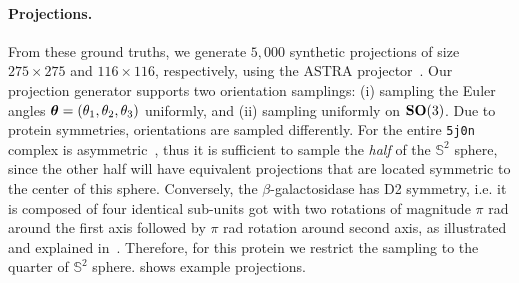 \paragraph{Projections.}
From these ground truths, we generate $5,000$ synthetic projections of size $275\times 275$ and $116\times 116$, respectively, using the ASTRA projector~\cite{van2015astra}.
Our projection generator supports two orientation samplings: (i) sampling the Euler angles ${\boldsymbol{\theta}}=(\theta_1,\theta_2,\theta_3)$ uniformly, and (ii) sampling uniformly on $\mathrm{\mathbf{SO}}(3)$.
Due to protein symmetries, orientations are sampled differently. For the entire \texttt{5j0n} complex is asymmetric~\cite{doi:10.1002/9780470514160.ch4}, thus it is sufficient to sample the \textit{half} of the $\mathbb{S}^2$ sphere, since the other half will have equivalent projections that are located symmetric to the center of this sphere. Conversely, the $\beta$-galactosidase has D2 symmetry, i.e. it is composed of four identical sub-units got with two rotations of magnitude $\pi$ rad around the first axis followed by $\pi$ rad rotation around second axis, as illustrated and explained in~\cite{symmetry_in_protein,symmetry,scipion-em-github, rcsb-symmetry-view, EmpereurMot2019GeometricDO}. Therefore, for this protein we restrict the sampling to the quarter of $\mathbb{S}^2$ sphere.
 shows example projections.

